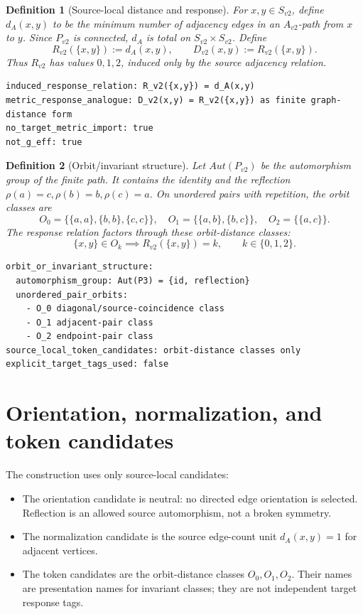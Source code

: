 \documentclass[11pt]{article}
\newtheorem{definition}{Definition}
\begin{document}
\begin{definition}[Source-local distance and response]
For \(x,y\in S_{v2}\), define \(d_A(x,y)\) to be the minimum number of
adjacency edges in an \(A_{v2}\)-path from \(x\) to \(y\). Since \(P_{v2}\) is
connected, \(d_A\) is total on \(S_{v2}\times S_{v2}\). Define
\[
  R_{v2}(\{x,y\}) := d_A(x,y),
  \qquad
  D_{v2}(x,y) := R_{v2}(\{x,y\}).
\]
Thus \(R_{v2}\) has values \(0,1,2\), induced only by the source adjacency
relation.
\end{definition}

\begin{verbatim}
induced_response_relation: R_v2({x,y}) = d_A(x,y)
metric_response_analogue: D_v2(x,y) = R_v2({x,y}) as finite graph-distance form
no_target_metric_import: true
not_g_eff: true
\end{verbatim}

\begin{definition}[Orbit/invariant structure]
Let \(Aut(P_{v2})\) be the automorphism group of the finite path. It contains
the identity and the reflection \(\rho(a)=c,\rho(b)=b,\rho(c)=a\). On
unordered pairs with repetition, the orbit classes are
\[
  O_0=\{\{a,a\},\{b,b\},\{c,c\}\},\quad
  O_1=\{\{a,b\},\{b,c\}\},\quad
  O_2=\{\{a,c\}\}.
\]
The response relation factors through these orbit-distance classes:
\[
  \{x,y\}\in O_k \implies R_{v2}(\{x,y\})=k,\qquad k\in\{0,1,2\}.
\]
\end{definition}

\begin{verbatim}
orbit_or_invariant_structure:
  automorphism_group: Aut(P3) = {id, reflection}
  unordered_pair_orbits:
    - O_0 diagonal/source-coincidence class
    - O_1 adjacent-pair class
    - O_2 endpoint-pair class
source_local_token_candidates: orbit-distance classes only
explicit_target_tags_used: false
\end{verbatim}

\section{Orientation, normalization, and token candidates}

The construction uses only source-local candidates:

\begin{itemize}
  \item The orientation candidate is neutral: no directed edge orientation is
  selected. Reflection is an allowed source automorphism, not a broken
  symmetry.
  \item The normalization candidate is the source edge-count unit
  \(d_A(x,y)=1\) for adjacent vertices.
  \item The token candidates are the orbit-distance classes \(O_0,O_1,O_2\).
  Their names are presentation names for invariant classes; they are not
  independent target response tags.
\end{itemize}
\end{document}
